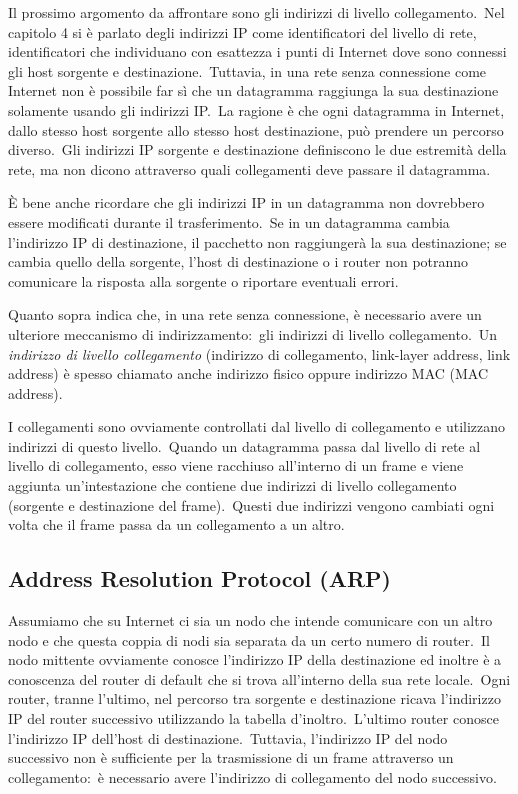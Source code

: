 Il prossimo argomento da affrontare sono gli indirizzi di livello collegamento.\
Nel capitolo 4 si è parlato degli indirizzi IP come identificatori del livello di rete, identificatori che individuano con esattezza i punti di Internet dove sono connessi gli host sorgente e destinazione.\
Tuttavia, in una rete senza connessione come Internet non è possibile far sì che un datagramma raggiunga la sua destinazione solamente usando gli indirizzi IP.\
La ragione è che ogni datagramma in Internet, dallo stesso host sorgente allo stesso host destinazione, può prendere un percorso diverso.\
Gli indirizzi IP sorgente e destinazione definiscono le due estremità della rete, ma non dicono attraverso quali collegamenti deve passare il datagramma.

È bene anche ricordare che gli indirizzi IP in un datagramma non dovrebbero essere modificati durante il trasferimento.\
Se in un datagramma cambia l'indirizzo IP di destinazione, il pacchetto non raggiungerà la sua destinazione; se cambia quello della sorgente, l'host di destinazione o i router non potranno comunicare la risposta alla sorgente o riportare eventuali errori.

Quanto sopra indica che, in una rete senza connessione, è necessario avere un ulteriore meccanismo di indirizzamento:\ gli indirizzi di livello collegamento.\
Un \emph{indirizzo di livello collegamento} (indirizzo di collegamento, link-layer address, link address) è spesso chiamato anche indirizzo fisico oppure indirizzo MAC (MAC address).

I collegamenti sono ovviamente controllati dal livello di collegamento e utilizzano indirizzi di questo livello.\
Quando un datagramma passa dal livello di rete al livello di collegamento, esso viene racchiuso all'interno di un frame e viene aggiunta un'intestazione che contiene due indirizzi di livello collegamento (sorgente e destinazione del frame).\
Questi due indirizzi vengono cambiati ogni volta che il frame passa da un collegamento a un altro.

\subsection{Address Resolution Protocol (ARP)}

Assumiamo che su Internet ci sia un nodo che intende comunicare con un altro nodo e che questa coppia di nodi sia separata da un certo numero di router.\
Il nodo mittente ovviamente conosce l'indirizzo IP della destinazione ed inoltre è a conoscenza del router di default che si trova all'interno della sua rete locale.\
Ogni router, tranne l'ultimo, nel percorso tra sorgente e destinazione ricava l'indirizzo IP del router successivo utilizzando la tabella d'inoltro.\
L'ultimo router conosce l'indirizzo IP dell'host di destinazione.\
Tuttavia, l'indirizzo IP del nodo successivo non è sufficiente per la trasmissione di un frame attraverso un collegamento:\ è necessario avere l'indirizzo di collegamento del nodo successivo.

